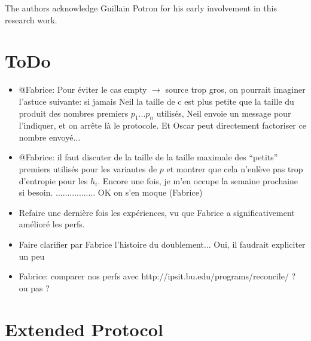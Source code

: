 \documentclass[11pt]{llncs}
\begin{document}
The authors acknowledge Guillain Potron for his early involvement in this research work.\smallskip

\section{ToDo}

\begin{itemize}

\item @Fabrice: Pour éviter le cas empty $\rightarrow$ source trop gros, on pourrait imaginer l'astuce suivante: si jamais Neil la taille de c est plus petite que la taille du produit des nombres premiers $p_1$...$p_n$ utilisés, Neil envoie un message pour l'indiquer, et on arr\^ete là le protocole. Et Oscar peut directement factoriser ce nombre envoyé...

\item @Fabrice: il faut discuter de la taille de la taille maximale des ``petits'' premiers utilisés pour les variantes de $p$ et montrer que cela n'enlève pas trop d'entropie pour les $h_i$. Encore une fois, je m'en occupe la semaine prochaine si besoin. ................. OK on s'en moque (Fabrice)

\item Refaire une dernière fois les expériences, vu que Fabrice a significativement amélioré les perfs.

\item Faire clarifier par Fabrice l'histoire du doublement... Oui, il faudrait expliciter un peu

\item Fabrice: comparer nos perfs avec http://ipsit.bu.edu/programs/reconcile/ ? ou pas ?

\end{itemize}

\nocite{rsync}
\nocite{wagner}



\appendix

\section{Extended Protocol}
\label{sec:extended}
\end{document}
